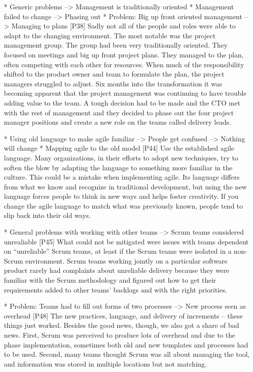 \documentclass[preprint,authoryear,12pt]{elsarticle}
\begin{document}
* Generic problems --> Management is traditionally oriented
* Management failed to change --> Phasing out
* Problem: Big up front oriented management --> Managing to plans
[P38]
Sadly not all of the people and roles were able to adapt to the changing
environment. The most notable was the project management group. The group had
been very traditionally oriented. They focused on meetings and big up front
project plans. They managed to the plan, often competing with each other for
resources. When much of the responsibility shifted to the product owner and team
to formulate the plan, the project managers struggled to adjust.
Six months into the transformation it was becoming apparent that the project
management was continuing to have trouble adding value to the team. A tough
decision had to be made and the CTO met with the rest of management and they
decided to phase out the four project manager positions and create a new role on
the teams called delivery leads.


* Using old language to make agile familiar --> People get confused --> Nothing will change
* Mapping agile to the old model
[P44]
Use the established agile language. Many organizations, in their efforts to
adopt new techniques, try to soften the blow by adapting the language to
something more familiar in the culture. This could be a mistake when
implementing agile. Its language differs from what we know and recognize in
traditional development, but using the new language forces people to think in
new ways and helps foster creativity. If you change the agile language to match
what was previously known, people tend to slip back into their old ways.


* General problems with working with other teams --> Scrum teams considered unrealiable
[P45]
What could not be mitigated were issues with teams dependent on “unreliable”
Scrum teams, at least if the Scrum teams were isolated in a non-Scrum
environment. Scrum teams working jointly on a particular software product rarely
had complaints about unreliable delivery because they were familiar with the
Scrum methodology and figured out how to get their requirements added to other
teams’ backlogs and with the right priorities.


* Problem: Teams had to fill out forms of two processes --> New process seen as overhead
[P48]
The new practices, language, and delivery of increments – these things just
worked. Besides the good news, though, we also got a share of bad news. First,
Scrum was perceived to produce lots of overhead and due to the phase
implementation, sometimes both old and new templates and processes had to be
used.  Second, many teams thought Scrum was all about managing the tool, and
information was stored in multiple locations but not matching.
\end{document}
